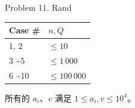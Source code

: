 \documentclass[UTF8]{beamer}
\begin{document}
\begin{frame}{Problem 11. Rand}

\begin{tabularx}{\textwidth}{X|X} \hline
Case \# & $n, Q$ \\ \hline \hline
1, 2                 & $\leq 10$       \\ \hline
3 \textasciitilde 5  & $\leq 1\,000$   \\ \hline
6 \textasciitilde 10 & $\leq 100\,000$ \\ \hline
\end{tabularx}

所有的 $a_i$、$v$ 满足 $1 \leq a_i, v \leq 10^4$。

\end{frame}
\end{document}
